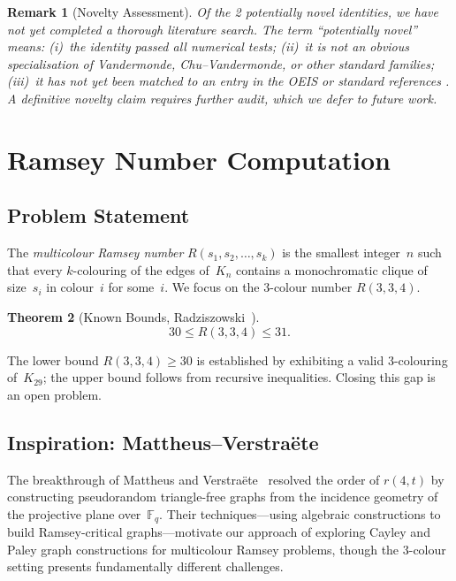 \documentclass[11pt,a4paper]{article}
\newtheorem{theorem}{Theorem}[section]
\newtheorem{remark}[theorem]{Remark}
\begin{document}
\begin{remark}[Novelty Assessment]\label{rem:novelty}
Of the 2 potentially novel identities, we have not yet completed a thorough
literature search. The term ``potentially novel'' means: (i)~the identity
passed all numerical tests; (ii)~it is not an obvious specialisation of
Vandermonde, Chu--Vandermonde, or other standard families; (iii)~it has not
yet been matched to an entry in the OEIS or standard references
\cite{gould1972,riordan1968}. A definitive novelty claim requires further
audit, which we defer to future work.
\end{remark}

\section{Ramsey Number Computation}\label{sec:ramsey}

\subsection{Problem Statement}

The \emph{multicolour Ramsey number} $R(s_1, s_2, \ldots, s_k)$ is the
smallest integer~$n$ such that every $k$-colouring of the edges of~$K_n$
contains a monochromatic clique of size~$s_i$ in colour~$i$ for some~$i$.
We focus on the 3-colour number $R(3,3,4)$.

\begin{theorem}[Known Bounds, Radziszowski~\cite{radziszowski2026}]\label{thm:known}
\[
  30 \leq R(3,3,4) \leq 31.
\]
\end{theorem}

\noindent The lower bound $R(3,3,4) \geq 30$ is established by exhibiting a
valid 3-colouring of~$K_{29}$; the upper bound follows from recursive
inequalities. Closing this gap is an open problem.

\subsection{Inspiration: Mattheus--Verstraëte}

The breakthrough of Mattheus and Verstraëte~\cite{mattheus2024} resolved the
order of $r(4,t)$ by constructing pseudorandom triangle-free graphs from the
incidence geometry of the projective plane over~$\mathbb{F}_q$. Their
techniques---using algebraic constructions to build Ramsey-critical
graphs---motivate our approach of exploring Cayley and Paley graph
constructions for multicolour Ramsey problems, though the 3-colour setting
presents fundamentally different challenges.
\end{document}

